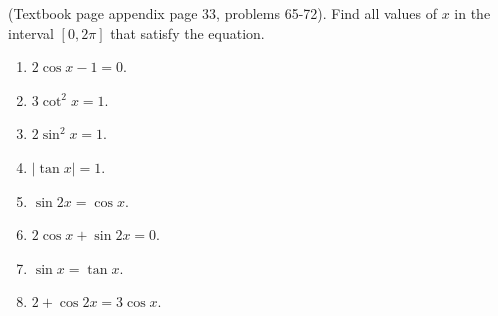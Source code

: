 (Textbook page appendix page 33, problems 65-72).
Find all values of $x$ in the interval $[0,2\pi]$ that satisfy the 
equation.
\begin{multicols}{2}
\begin{enumerate}
\item $2\cos x - 1=0$. \\  
\item $3\cot^2 x= 1$. \\ 
\item $2\sin^2 x= 1$. \\ 
\item $|\tan x|=1 $. \\ 
\item $\sin 2x = \cos x $.  \\ 
\item $2\cos x +\sin 2x=0$.\\ 
\item $\sin x =\tan x$. \\ 
\item $2+\cos 2x = 3 \cos x$. \\ 
\end{enumerate}
\end{multicols}

